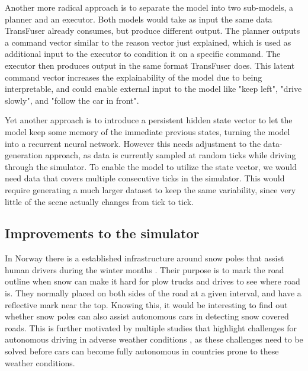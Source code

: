 Another more radical approach is to separate the model into two sub-models,
a planner and an executor.
Both models would take as input the same data TransFuser already consumes,
but produce different output.
The planner outputs a command vector similar to the reason vector just explained,
which is used as additional input to the executor to condition it on a specific command.
The executor then produces output in the same format TransFuser does.
This latent command vector increases the explainability of the model
due to being interpretable,
and could enable external input to the model like
"keep left", "drive slowly", and "follow the car in front".

Yet another approach is to introduce a persistent hidden state vector
to let the model keep some memory of the immediate previous states,
turning the model into a recurrent neural network.
However this needs adjustment to the data-generation approach,
as data is currently sampled at random ticks while driving through the simulator.
To enable the model to utilize the state vector,
we would need data that covers multiple consecutive ticks in the simulator.
This would require generating a much larger dataset to keep the same variability,
since very little of the scene actually changes from tick to tick.


\subsection{Improvements to the simulator}




 In Norway there is a established infrastructure around snow poles that assist human drivers during the winter months \cite{statens-vegvesen-handbok-111}. Their purpose is to mark the road outline when snow can make it hard for plow trucks and drives to see where road is. They normally placed on both sides of the road at a given interval, and have a reflective mark near the top. Knowing this, it would be interesting to find out whether snow poles can also assist autonomous cars in detecting snow covered roads. This is further motivated by multiple studies that highlight challenges for autonomous driving in adverse weather conditions \cite{impact-of-adverse-weather-conditions, Sensor-Fusion-Based-Semantic-Segmentation}, as these challenges need to be solved before cars can become fully autonomous in countries prone to these weather conditions.

